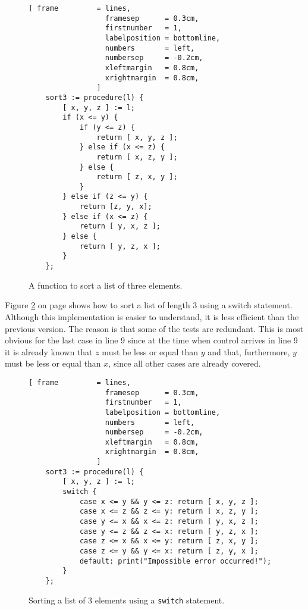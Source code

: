 \begin{figure}[!ht]
\centering
\begin{Verbatim}[ frame         = lines, 
                  framesep      = 0.3cm, 
                  firstnumber   = 1,
                  labelposition = bottomline,
                  numbers       = left,
                  numbersep     = -0.2cm,
                  xleftmargin   = 0.8cm,
                  xrightmargin  = 0.8cm,
                ]
    sort3 := procedure(l) {
        [ x, y, z ] := l;
        if (x <= y) {
            if (y <= z) {
                return [ x, y, z ];
            } else if (x <= z) { 
                return [ x, z, y ];
            } else {
                return [ z, x, y ];
            }
        } else if (z <= y) { 
            return [z, y, x];
        } else if (x <= z) { 
            return [ y, x, z ];
        } else {
            return [ y, z, x ];
        }
    };
\end{Verbatim}
\vspace*{-0.3cm}
\caption{A function to sort a list of three elements.}
\label{fig:sort3.stlx}
\end{figure}

Figure \ref{fig:sort3switch.stlx} on page \pageref{fig:sort3switch.stlx} 
shows how to sort a list of length 3 using a switch
statement.  Although this implementation is easier to understand, it is less efficient than the
previous version.  The reason is that some of the tests are redundant.  This is most obvious for the
last case in line 9 since at the time when control arrives in line 9 it is already known that $z$ must be
less or equal than $y$ and that, furthermore, $y$ must be less or equal than $x$, since all other
cases are already covered.

\begin{figure}[!ht]
\centering
\begin{Verbatim}[ frame         = lines, 
                  framesep      = 0.3cm, 
                  firstnumber   = 1,
                  labelposition = bottomline,
                  numbers       = left,
                  numbersep     = -0.2cm,
                  xleftmargin   = 0.8cm,
                  xrightmargin  = 0.8cm,
                ]
    sort3 := procedure(l) {
        [ x, y, z ] := l;
        switch {
            case x <= y && y <= z: return [ x, y, z ];
            case x <= z && z <= y: return [ x, z, y ];
            case y <= x && x <= z: return [ y, x, z ];
            case y <= z && z <= x: return [ y, z, x ];
            case z <= x && x <= y: return [ z, x, y ];
            case z <= y && y <= x: return [ z, y, x ];
            default: print("Impossible error occurred!");
        }
    };
\end{Verbatim}
\vspace*{-0.3cm}
\caption{Sorting a list of 3 elements using a \texttt{switch} statement.}
\label{fig:sort3switch.stlx}
\end{figure}

